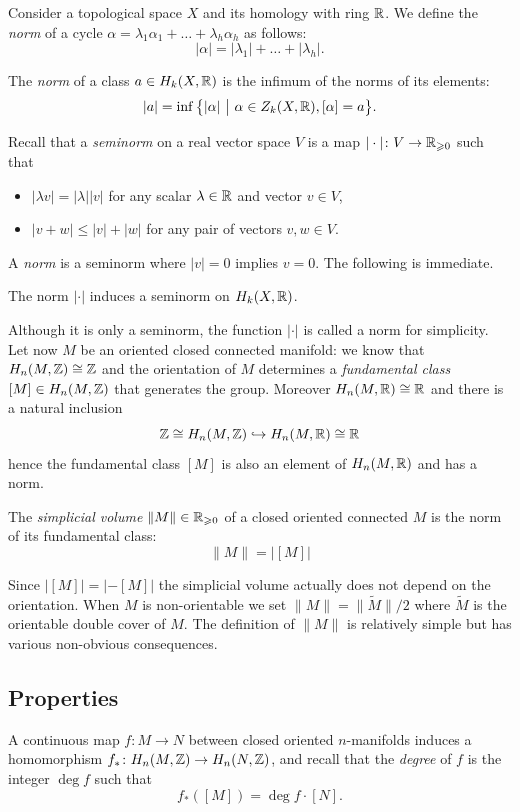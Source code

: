 Consider a topological space $X$ and its homology with ring $\mathbb{R}$. We define the \emph{norm} of a cycle $\alpha = \lambda_1\alpha_1+\ldots +\lambda_h\alpha_h$ as follows:
$$|\alpha| = |\lambda_1|+\ldots +|\lambda_h|.$$

\begin{defn} The \emph{norm} of a class $a \in H_k(X,\mathbb{R})$ is the infimum of the norms of its elements: 
$$|a| = \inf \big\{|\alpha| \ \big|\ \alpha \in Z_k(X,\mathbb{R}), [\alpha] = a \big\}.$$
\end{defn}

Recall that a \emph{seminorm} on a real vector space $V$ is a map $|\cdot|\colon V \to \mathbb{R}_{\geqslant 0}$ such that
\begin{itemize}
\item $|\lambda v| = |\lambda||v|$ for any scalar $\lambda\in \mathbb{R}$ and vector $v\in V$,
\item $|v+w| \leqslant |v|+|w|$ for any pair of vectors $v,w \in V$.
\end{itemize}
A \emph{norm} is a seminorm where $|v|=0$ implies $v=0$. The following is immediate.
\begin{prop} The norm $|\cdot |$ induces a seminorm on $H_k(X,\mathbb{R})$.
\end{prop}

Although it is only a seminorm, the function $|\cdot|$ is called a norm for simplicity. Let now $M$ be an oriented closed connected manifold: we know that $H_n(M,\mathbb{Z})\cong \mathbb{Z}$ and the orientation of $M$ determines a \emph{fundamental class} $[M] \in H_n(M,\mathbb{Z})$ that generates the group. Moreover $H_n(M,\mathbb{R})\cong \mathbb{R}$ and there is a natural inclusion  
$$\mathbb{Z} \cong H_n(M,\mathbb{Z}) \hookrightarrow H_n(M,\mathbb{R}) \cong \mathbb{R}$$
hence the fundamental class $[M]$ is also an element of $H_n(M,\mathbb{R})$ and has a norm. 
\begin{defn} The \emph{simplicial volume} $\|M\|\in\mathbb{R}_{\geqslant 0}$ of a closed oriented connected $M$ is the norm of its fundamental class:
$$\|M\| = |[M]|$$
\end{defn}
Since $|[M]| = |-[M]|$ the simplicial volume actually does not depend on the orientation. 
When $M$ is non-orientable we set $\|M\| = \big\|\tilde M\big\|/2$ where $\tilde M$ is the orientable double cover of $M$. The definition of $\|M\|$ is relatively simple but has various non-obvious consequences.

\subsection{Properties}
A continuous map $f\colon M \to N$ between closed oriented $n$-manifolds induces a homomorphism $f_*\colon H_n(M,\mathbb{Z}) \to H_n(N,\mathbb{Z})$, and recall that the \emph{degree} of $f$ is the integer $\deg f$ such that
$$f_*([M]) = \deg f \cdot [N].$$


